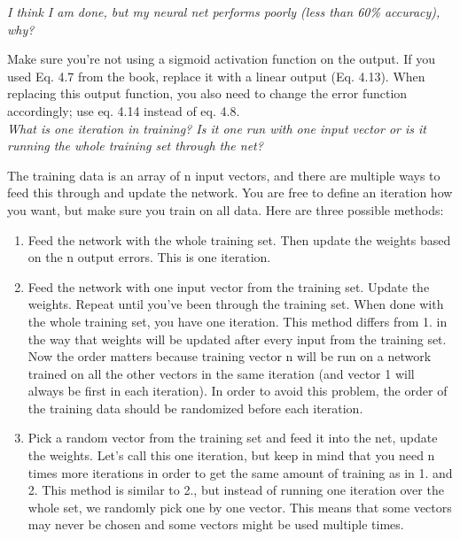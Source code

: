 \noindent
\textit{I think I am done, but my neural net performs poorly (less than 60\% accuracy), why?}

Make sure you’re not using a sigmoid activation function on the output.
If you used Eq. 4.7 from the book, replace it with a linear output (Eq. 4.13).
When replacing this output function, you also need to change the error function accordingly;
use eq. 4.14 instead of eq. 4.8.\\

\noindent
\textit{What is one iteration in training?
Is it one run with one input vector or is it running the whole training set through the net?}

The training data is an array of n input vectors,
and there are multiple ways to feed this through and update the network.
You are free to define an iteration how you want,
but make sure you train on all data.
Here are three possible methods:
\begin{enumerate}

    \item   Feed the network with the whole training set.
            Then update the weights based on the n output errors.
            This is one iteration.

    \item   Feed the network with one input vector from the training set.
            Update the weights.
            Repeat until you’ve been through the training set.
            When done with the whole training set, you have one iteration.
            This method differs from 1. in the way that weights will be updated after every input from the training set.
            Now the order matters because training vector n will be run on a network trained on all the other vectors in the same iteration (and vector 1 will always be first in each iteration).
            In order to avoid this problem, the order of the training data should be randomized before each iteration.

    \item   Pick a random vector from the training set and feed it into the net, update the weights.
            Let’s call this one iteration, but keep in mind that you need n times more iterations in order to get the same amount of training as in 1. and 2.
            This method is similar to 2., but instead of running one iteration over the whole set,
            we randomly pick one by one vector.
            This means that some vectors may never be chosen and some vectors might be used multiple times.

\end{enumerate}

